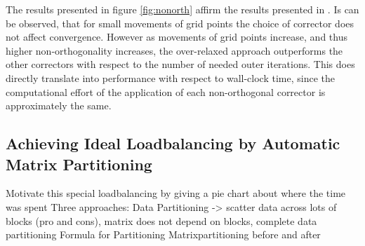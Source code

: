 The results presented in figure \ref{fig:nonorth} affirm the results presented in \cite{jasak96}. Is can be observed, that for small movements of grid points the choice of corrector does not affect convergence. However as movements of grid points increase, and thus higher non-orthogonality increases, the over-relaxed approach outperforms the other correctors with respect to the number of needed outer iterations. This does directly translate into performance with respect to wall-clock time, since the computational effort of the application of each non-orthogonal corrector is approximately the same.

\subsection{Achieving Ideal Loadbalancing by Automatic Matrix Partitioning}

Motivate this special loadbalancing by giving a pie chart about where the time was spent
Three approaches: Data Partitioning -> scatter data across lots of blocks (pro and cons), matrix does not depend on blocks, complete data partitioning
Formula for Partitioning
Matrixpartitioning before and after

